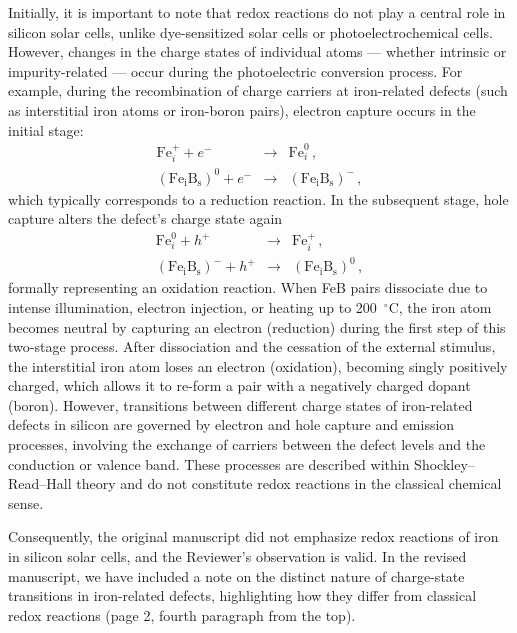 \documentclass[a4paper,fleqn]{cas-sc}
\begin{document}
Initially, it is important to note that
redox reactions do not play a central role in silicon solar cells,
unlike dye-sensitized solar cells or photoelectrochemical cells.
However, changes in the charge states of individual atoms --- whether intrinsic or impurity-related ---
occur during the photoelectric conversion process.
For example, during the recombination of charge carriers at iron-related defects
(such as interstitial iron atoms or iron-boron pairs),
electron capture occurs in the initial stage:
\begin{eqnarray*}
  \mathrm{Fe}_i^++e^-&\rightarrow& \mathrm{Fe}_i^0\,, \\
  (\mathrm{Fe_iB_s})^0+e^-&\rightarrow& (\mathrm{Fe_iB_s})^-\,,
\end{eqnarray*}
which typically corresponds to a reduction reaction.
In the subsequent stage, hole capture alters the defect's charge state again
\begin{eqnarray*}
  \mathrm{Fe}_i^0+h^+&\rightarrow& \mathrm{Fe}_i^+\,, \\
  (\mathrm{Fe_iB_s})^-+h^+&\rightarrow& (\mathrm{Fe_iB_s})^0\,,
\end{eqnarray*}
formally representing an oxidation reaction.
When FeB pairs dissociate due to intense illumination, electron injection, or heating up to 200~$^\circ$C,
the iron atom becomes neutral by capturing an electron (reduction) during the first step of this two-stage process.
After dissociation and the cessation of the external stimulus,
the interstitial iron atom loses an electron (oxidation),
becoming singly positively charged, which allows it to re-form a pair with a negatively charged dopant (boron).
However, transitions between different charge states of iron-related defects in silicon
are governed by electron and hole capture and emission processes,
involving the exchange of carriers between the defect levels and the conduction or valence band.
These processes are described within Shockley–Read–Hall theory
and do not constitute redox reactions in the classical chemical sense.

Consequently, the original manuscript did not emphasize redox reactions of iron in silicon solar cells,
and the Reviewer’s observation is valid.
In the revised manuscript, we have included a note on the distinct nature of charge-state transitions in iron-related defects,
highlighting how they differ from classical redox reactions (page 2, fourth paragraph from the top).
\end{document}
